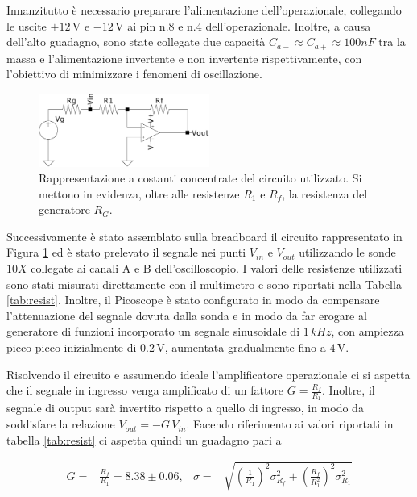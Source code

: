 \documentclass[a4paper,11pt]{article}
\begin{document}
Innanzitutto è necessario preparare l'alimentazione dell'operazionale, collegando le uscite
$+12\,\si{\volt}$ e $-12\,\si{\volt}$ ai pin n.8 e n.4 dell'operazionale.
Inoltre, a causa dell'alto guadagno, sono state collegate due capacità
$C_{a-}\approx C_{a+} \approx 100\si{nF}$ tra la massa e l'alimentazione invertente e non invertente
rispettivamente, con l'obiettivo di minimizzare i fenomeni di oscillazione.

\begin{figure}
\centering
\includegraphics[width=0.5\textwidth]{images/circuit_inv}
\caption{\footnotesize Rappresentazione a costanti concentrate del circuito utilizzato.
  Si mettono in evidenza, oltre alle resistenze $R_{1}$ e $R_{f}$, la resistenza del
generatore $R_{G}$.}
\label{fig:wrapfig}
\end{figure}
Successivamente è stato assemblato sulla breadboard il circuito rappresentato in Figura \ref{fig:wrapfig}
ed è stato prelevato il segnale nei punti $V_{in}$ e $V_{out}$ utilizzando le sonde
$10X$ collegate ai canali A e B dell'oscilloscopio. I valori delle resistenze utilizzati sono stati
misurati direttamente con il multimetro e sono riportati nella Tabella \ref{tab:resist}.
Inoltre, il Picoscope è stato configurato in modo da compensare l'attenuazione del segnale dovuta dalla sonda e in modo da far erogare al generatore di funzioni incorporato un segnale sinusoidale di $1\,\si{kHz}$, con ampiezza picco-picco inizialmente di $0.2\, \si{\volt}$, aumentata gradualmente fino a $4\,\si{\volt}$.


Risolvendo il circuito e assumendo ideale l'amplificatore operazionale ci si aspetta che
il segnale in ingresso venga amplificato di un fattore $G = \frac{R_{f}}{R_{1}}$.
Inoltre, il segnale di output sarà invertito rispetto a quello di ingresso, in modo
da soddisfare la relazione $V_{out}=-G\, V_{in}$. Facendo riferimento ai valori riportati
in tabella \autoref{tab:resist} ci aspetta quindi un guadagno pari a

\begin{align}\label{e:guadagno}
  G=&\frac{R_{f}}{R_{1}} = 8.38 \pm 0.06,
  &
  \sigma= &\sqrt{ \left( \frac{1}{R_{1}} \right)^{2} \sigma_{R_{f}}^{2} +
			\left( \frac{R_{f}}{R_{1}^{2}} \right)^{2} \sigma_{R_{1}}^{2}}
\end{align}
\end{document}

